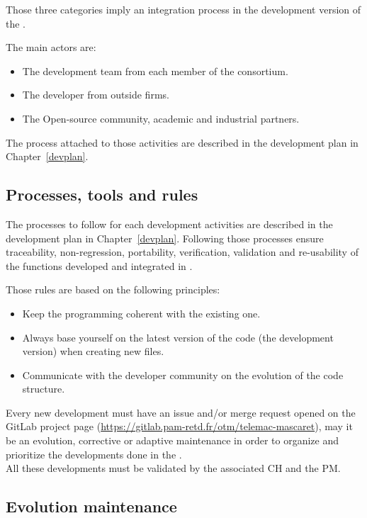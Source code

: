 Those three categories imply an integration process in the development version
of the \telemacsystem.

The main actors are:
\begin{itemize}
\item The development team from each member of the consortium.
\item The developer from outside firms.
\item The Open-source community, academic and industrial partners.
\end{itemize}
The process attached to those activities are described in the development plan
in Chapter~\ref{devplan}.

\subsection{Processes, tools and rules}

The processes to follow for each development activities are described in the
development plan in Chapter~\ref{devplan}. Following those processes ensure
traceability, non-regression, portability, verification, validation and
re-usability of the functions developed and integrated in \telemacsystem.

Those rules are based on the following principles:
\begin{itemize}
\item Keep the programming coherent with the existing one.
\item Always base yourself on the latest version of the code (the development
  version) when creating new files.
\item Communicate with the developer community on the evolution of the code
  structure.
\end{itemize}

Every new development must have an issue and/or merge request opened on the
\telemacsystem{} GitLab project page
(\url{https://gitlab.pam-retd.fr/otm/telemac-mascaret}), may it be an
evolution, corrective or adaptive maintenance in order to organize and
prioritize the developments done in the \telemacsystem{}.\\

All these developments must be validated by the associated CH and the PM\@.

\subsection{Evolution maintenance}

